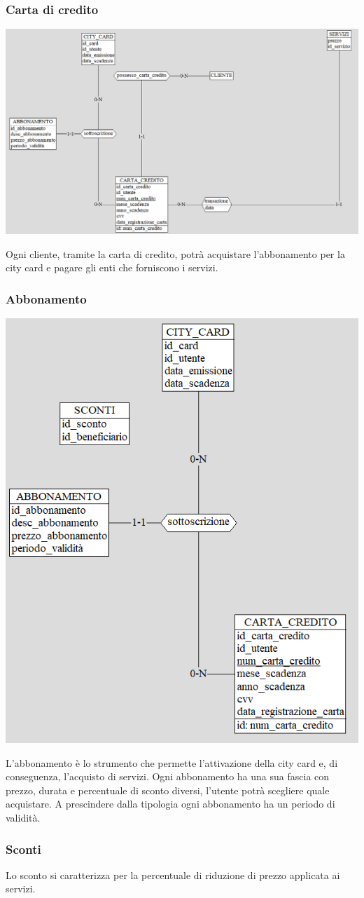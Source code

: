 \subsubsection{Carta di credito}
\begin{center}
\includegraphics[width=0.95\columnwidth]{images/CartaDiCredito.png}
\end{center}
Ogni cliente, tramite la carta di credito, potrà acquistare l'abbonamento per la city card e pagare gli enti che forniscono i servizi.


\subsubsection{Abbonamento}
\begin{center}
\includegraphics[width=0.95\columnwidth]{images/Abbonamento.png}
\end{center}
L'abbonamento è lo strumento che permette l'attivazione della city card e, di conseguenza, l'acquisto di servizi. Ogni abbonamento ha una sua fascia con prezzo, durata e percentuale di sconto diversi, l'utente potrà scegliere quale acquistare. A prescindere dalla tipologia ogni abbonamento ha un periodo di validità.

\subsubsection{Sconti}
Lo sconto si caratterizza per la percentuale di riduzione di prezzo applicata ai servizi.